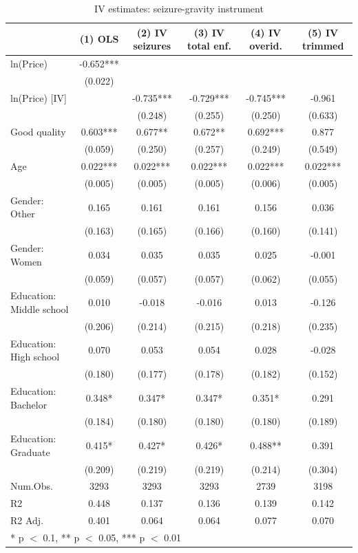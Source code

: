 \begin{table}[H]
\centering
\caption{IV estimates: seizure-gravity instrument}
\label{tab:iv-gravity}
\centering
\begin{tabular}[t]{lccccc}
\toprule
  & (1) OLS & (2) IV seizures & (3) IV total enf. & (4) IV overid. & (5) IV trimmed\\
\midrule
ln(Price) & -0.652*** &  &  &  & \\
 & (0.022) &  &  &  & \\
ln(Price) [IV] &  & -0.735*** & -0.729*** & -0.745*** & -0.961\\
 &  & (0.248) & (0.255) & (0.250) & (0.633)\\
Good quality & 0.603*** & 0.677** & 0.672** & 0.692*** & 0.877\\
 & (0.059) & (0.250) & (0.257) & (0.249) & (0.549)\\
Age & 0.022*** & 0.022*** & 0.022*** & 0.022*** & 0.022***\\
 & (0.005) & (0.005) & (0.005) & (0.006) & (0.005)\\
Gender: Other & 0.165 & 0.161 & 0.161 & 0.156 & 0.036\\
 & (0.163) & (0.165) & (0.166) & (0.160) & (0.141)\\
Gender: Women & 0.034 & 0.035 & 0.035 & 0.025 & -0.001\\
 & (0.059) & (0.057) & (0.057) & (0.062) & (0.055)\\
Education: Middle school & 0.010 & -0.018 & -0.016 & 0.013 & -0.126\\
 & (0.206) & (0.214) & (0.215) & (0.218) & (0.235)\\
Education: High school & 0.070 & 0.053 & 0.054 & 0.028 & -0.028\\
 & (0.180) & (0.177) & (0.178) & (0.182) & (0.152)\\
Education: Bachelor & 0.348* & 0.347* & 0.347* & 0.351* & 0.291\\
 & (0.184) & (0.180) & (0.180) & (0.180) & (0.189)\\
Education: Graduate & 0.415* & 0.427* & 0.426* & 0.488** & 0.391\\
 & (0.209) & (0.219) & (0.219) & (0.214) & (0.304)\\
\midrule
Num.Obs. & 3293 & 3293 & 3293 & 2739 & 3198\\
R2 & 0.448 & 0.137 & 0.136 & 0.139 & 0.142\\
R2 Adj. & 0.401 & 0.064 & 0.064 & 0.077 & 0.070\\
\bottomrule
\multicolumn{6}{l}{\rule{0pt}{1em}* p $<$ 0.1, ** p $<$ 0.05, *** p $<$ 0.01}\\

\end{tabular}
\end{table}
